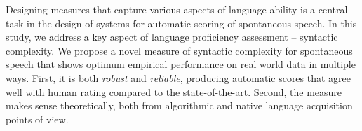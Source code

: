 Designing measures that capture various aspects of language ability is a central task in the design of systems for automatic scoring of spontaneous speech. In this study, we address a key aspect of language proficiency assessment -- syntactic complexity.  We propose a novel measure of syntactic complexity for spontaneous speech that shows optimum empirical performance on real world data in multiple ways. First, it is both {\it robust} and {\it reliable}, producing  automatic scores that agree well with human rating compared to the state-of-the-art.  Second, the measure makes sense theoretically, both from algorithmic and native language acquisition points of view.
